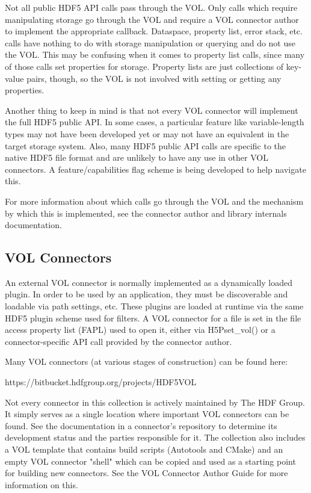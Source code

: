 Not all public HDF5 API calls pass through the VOL. Only calls which require manipulating storage go through the VOL and require a VOL connector author to implement the appropriate callback. Dataspace, property list, error stack, etc. calls have nothing to do with storage manipulation or querying and do not use the VOL. This may be confusing when it comes to property list calls, since many of those calls set properties for storage. Property lists are just collections of key-value pairs, though, so the VOL is not involved with setting or getting any properties.

Another thing to keep in mind is that not every VOL connector will implement the full HDF5 public API. In some cases, a particular feature like variable-length types may not have been developed yet or may not have an equivalent in the target storage system. Also, many HDF5 public API calls are specific to the native HDF5 file format and are unlikely to have any use in other VOL connectors. A feature/capabilities flag scheme is being developed to help navigate this.

For more information about which calls go through the VOL and the mechanism by which this is implemented, see the connector author and library internals documentation.

\subsection{VOL Connectors}

An external VOL connector is normally implemented as a dynamically loaded plugin. In order to be used by an application, they must be discoverable and loadable via path settings, etc. These plugins are loaded at runtime via the same HDF5 plugin scheme used for filters. A VOL connector for a file is set in the file access property list (FAPL) used to open it, either via H5Pset\_vol() or a connector-specific API call provided by the connector author.

Many VOL connectors (at various stages of construction) can be found here:

\quad \quad https://bitbucket.hdfgroup.org/projects/HDF5VOL

Not every connector in this collection is actively maintained by The HDF Group. It simply serves as a single location where important VOL connectors can be found. See the documentation in a connector's repository to determine its development status and the parties responsible for it. The collection also includes a VOL template that contains build scripts (Autotools and CMake) and an empty VOL connector "shell" which can be copied and used as a starting point for building new connectors. See the VOL Connector Author Guide for more information on this.

